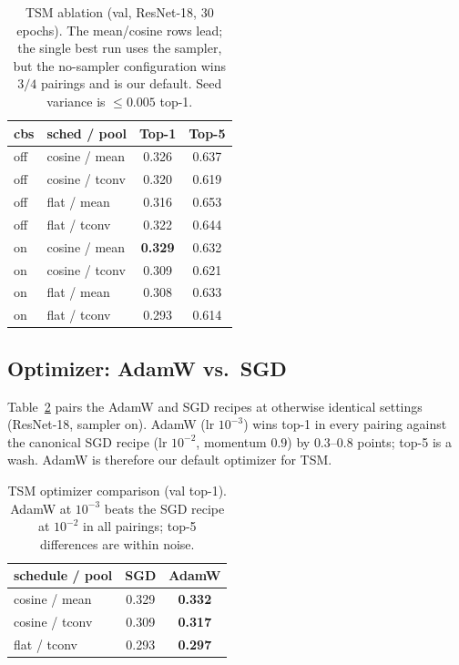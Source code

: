 \documentclass[10pt,twocolumn,letterpaper]{article}
\begin{document}
\begin{table}[h]
\centering
\small
\begin{tabular}{llcc}
\toprule
\textbf{cbs} & \textbf{sched / pool} & \textbf{Top-1} & \textbf{Top-5} \\
\midrule
off & cosine / mean   & 0.326 & 0.637 \\
off & cosine / tconv  & 0.320 & 0.619 \\
off & flat / mean     & 0.316 & 0.653 \\
off & flat / tconv    & 0.322 & 0.644 \\
on  & cosine / mean   & \textbf{0.329} & 0.632 \\
on  & cosine / tconv  & 0.309 & 0.621 \\
on  & flat / mean     & 0.308 & 0.633 \\
on  & flat / tconv    & 0.293 & 0.614 \\
\bottomrule
\end{tabular}
\caption{TSM ablation (val, ResNet-18, $30$ epochs). The mean/cosine
rows lead; the single best run uses the sampler, but the no-sampler
configuration wins $3/4$ pairings and is our default. Seed variance is
$\le 0.005$ top-1.}
\label{tab:tsm-ablation}
\end{table}

\subsection{Optimizer: AdamW vs.~SGD}

Table~\ref{tab:opt} pairs the AdamW and SGD recipes at otherwise
identical settings (ResNet-18, sampler on). AdamW (lr $10^{-3}$) wins
top-1 in every pairing against the canonical SGD recipe
(lr $10^{-2}$, momentum $0.9$) by $0.3$--$0.8$ points; top-5 is a wash.
AdamW is therefore our default optimizer for TSM.

\begin{table}[h]
\centering
\small
\begin{tabular}{lcc}
\toprule
\textbf{schedule / pool} & \textbf{SGD} & \textbf{AdamW} \\
\midrule
cosine / mean   & 0.329 & \textbf{0.332} \\
cosine / tconv  & 0.309 & \textbf{0.317} \\
flat / tconv    & 0.293 & \textbf{0.297} \\
\bottomrule
\end{tabular}
\caption{TSM optimizer comparison (val top-1). AdamW at $10^{-3}$ beats
the SGD recipe at $10^{-2}$ in all pairings; top-5 differences are
within noise.}
\label{tab:opt}
\end{table}
\end{document}
